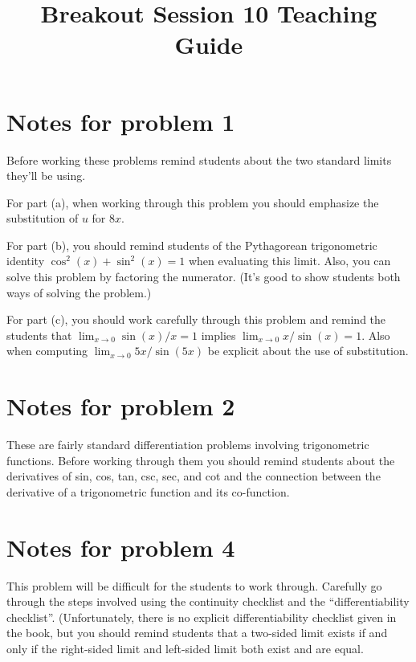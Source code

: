 \documentclass[handout,nooutcomes]{ximera}
\title{Breakout Session 10 Teaching Guide}
\begin{document}
\begin{abstract}


\end{abstract}
\maketitle

\section{Notes for problem 1}
Before working these problems remind students about the two standard limits they'll be using.

For part (a), when working through this problem you should emphasize the substitution of $u$ for $8x$.

For part (b), you should remind students of the Pythagorean trigonometric identity $\cos^2(x) + \sin^2(x) = 1$ when evaluating this limit.
Also, you can solve this problem by factoring the numerator.
(It's good to show students both ways of solving the problem.)

For part (c), you should work carefully through this problem and remind the students that $\lim_{x \to 0} \sin(x)/x = 1$ implies $\lim_{x \to 0} x/\sin(x) = 1$.
Also when computing $\lim_{x \to 0} 5x/\sin(5x)$ be explicit about the use of substitution.

\section{Notes for problem 2}
These are fairly standard differentiation problems involving trigonometric functions.
Before working through them you should remind students about the derivatives of sin, cos, tan, csc, sec, and cot and the connection between the derivative of a trigonometric function and its co-function.



\section{Notes for problem 4}
This problem will be difficult for the students to work through.
Carefully go through the steps involved using the continuity checklist and the ``differentiability checklist''.
(Unfortunately, there is no explicit differentiability checklist given in the book, but you should remind students that a two-sided limit exists if and only if the right-sided limit and left-sided limit both exist and are equal.
\end{document}
